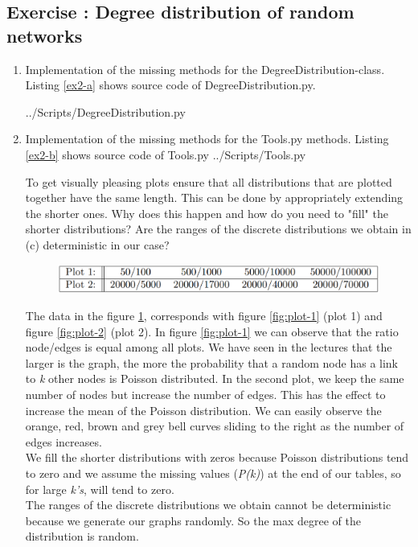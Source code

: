 \documentclass[10pt,a4paper]{article}
\newcommand{\exercise}[1]
{
  \stepcounter{subsection}
  \subsection*{Exercise \thesubsection: #1}

}
\begin{document}
\exercise{Degree distribution of random networks }
\begin{enumerate}
	\item Implementation of the missing methods for the DegreeDistribution-class. Listing \ref{ex2-a} shows source code of DegreeDistribution.py. 
	
	 {../Scripts/DegreeDistribution.py}
	
	\item Implementation of the missing methods for the Tools.py methods. Listing \ref{ex2-b} shows source code of Tools.py
	 {../Scripts/Tools.py}
	
	To get visually pleasing plots ensure that all distributions that are plotted together have the same length. This can be done by appropriately extending the shorter ones. Why does 	this happen and how do you need to "fill" the shorter distributions? Are the ranges of the discrete distributions we obtain in (c) deterministic in our case?
	
\begin{figure}[H]
	\centering
	\includegraphics[width=0.7\linewidth]{tabledata}
	\caption{}
	\label{fig:tabledata}
\end{figure}

	The data in the figure \ref{fig:tabledata}, corresponds with figure \ref{fig:plot-1} (plot 1) and figure \ref{fig:plot-2} (plot 2). In figure \ref{fig:plot-1} we can observe that the ratio node/edges is equal among all plots. We have seen in the lectures that the larger is the graph, the more the probability that a random node has a link to \textit{k} other nodes is Poisson distributed. In the second plot, we keep the same number of nodes but increase the number of edges. This has the effect to increase the mean of the Poisson distribution. We can easily observe the orange, red, brown and grey bell curves sliding to the right as the number of edges increases. \\
	
	
	We fill the shorter distributions with zeros because Poisson distributions tend to zero and we assume the missing values (\textit{P(k)}) at the end of our tables, so for large \textit{k's}, will tend to zero. \\
	
	
	The ranges of the discrete distributions we obtain cannot be deterministic because we generate our graphs randomly. So the max degree of the distribution is random. 
	 



\end{enumerate}
\end{document}
